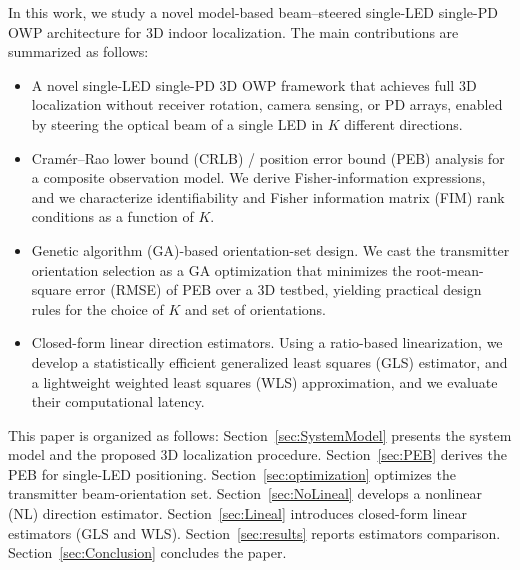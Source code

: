 \documentclass[journal]{IEEEtran}
\begin{document}
In this work, we study a novel model-based beam–steered single-LED single-PD OWP architecture for 3D indoor localization. The main contributions are summarized as follows:
\begin{itemize}
    \item A novel single-LED single-PD 3D OWP framework that achieves full 3D localization without receiver rotation, camera sensing, or PD arrays, enabled by steering the optical beam of a single LED in $K$ different directions.
    \item Cramér–Rao lower bound (CRLB) / position error bound (PEB) analysis for a composite observation model. We derive Fisher-information expressions, and we characterize identifiability and Fisher information matrix (FIM) rank conditions as a function of \(K\).
    \item Genetic algorithm (GA)-based orientation-set design. We cast the transmitter orientation selection as a GA optimization that minimizes the root-mean-square error (RMSE) of PEB over a 3D testbed, yielding practical design rules for the choice of \(K\) and set of orientations.
    \item Closed-form linear direction estimators. Using a ratio-based linearization, we develop a statistically efficient generalized least squares (GLS) estimator, and a lightweight weighted least squares (WLS) approximation, and we evaluate their computational latency.

\end{itemize}

This paper is organized as follows:
Section~\ref{sec:SystemModel} presents the system model and the proposed 3D localization procedure.
Section~\ref{sec:PEB} derives the PEB for single-LED positioning.
Section~\ref{sec:optimization} optimizes the transmitter beam-orientation set.
Section~\ref{sec:NoLineal} develops a nonlinear (NL) direction estimator.
Section~\ref{sec:Lineal} introduces closed-form linear estimators (GLS and WLS).
Section~\ref{sec:results} reports estimators comparison.
Section~\ref{sec:Conclusion} concludes the paper.
\end{document}
